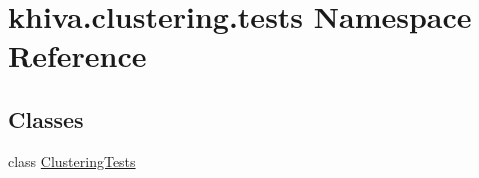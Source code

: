 \hypertarget{namespacekhiva_1_1clustering_1_1tests}{}\section{khiva.\+clustering.\+tests Namespace Reference}
\label{namespacekhiva_1_1clustering_1_1tests}
\subsection*{Classes}
\begin{DoxyCompactItemize}
\item 
class \mbox{\hyperlink{classkhiva_1_1clustering_1_1tests_1_1_clustering_tests}{Clustering\+Tests}}
\end{DoxyCompactItemize}
